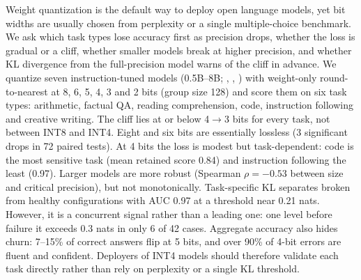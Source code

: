 Weight quantization is the default way to deploy open language models, yet bit widths are usually chosen from perplexity or a single multiple-choice benchmark. We ask which task types lose accuracy first as precision drops, whether the loss is gradual or a cliff, whether smaller models break at higher precision, and whether KL divergence from the full-precision model warns of the cliff in advance. We quantize seven instruction-tuned models (0.5B--8B; \qwen, \llama, \phithree) with weight-only round-to-nearest at 8, 6, 5, 4, 3 and 2 bits (group size 128) and score them on six task types: arithmetic, factual QA, reading comprehension, code, instruction following and creative writing. The cliff lies at or below 4$\to$3 bits for every task, not between INT8 and INT4. Eight and six bits are essentially lossless (3 significant drops in 72 paired tests). At 4 bits the loss is modest but task-dependent: code is the most sensitive task (mean retained score 0.84) and instruction following the least (0.97). Larger models are more robust (Spearman $\rho=-0.53$ between size and critical precision), but not monotonically. Task-specific KL separates broken from healthy configurations with AUC 0.97 at a threshold near 0.21 nats. However, it is a concurrent signal rather than a leading one: one level before failure it exceeds 0.3 nats in only 6 of 42 cases. Aggregate accuracy also hides churn: 7--15\% of correct answers flip at 5 bits, and over 90\% of 4-bit errors are fluent and confident. Deployers of INT4 models should therefore validate each task directly rather than rely on perplexity or a single KL threshold.
